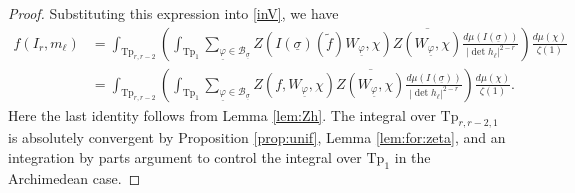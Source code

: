\documentclass[12pt]{amsart}
\theoremstyle{remark}
\numberwithin{equation}{section}
\theoremstyle{definition}
\numberwithin{equation}{subsection}
\begin{document}
\begin{proof}
Substituting this expression into \eqref{inV}, we have
 \begin{align*}
     f(I_r,m_\ell)&=\int_{\mathrm{Tp}_{r,r-2}}\left(\int_{\mathrm{Tp}_1} \sum_{\underline{\varphi}\in \mathcal{B}_{\underline{\sigma}}} Z(I(\underline{\sigma})(\widetilde{f})W_{\underline{\varphi}},\chi)\overline{Z(W_{\underline{\varphi}},\chi)}\frac{d\mu(I(\underline{\sigma}))}{|\det h_\ell|^{2-r}}\right)\frac{d\mu(\chi)}{\zeta(1)}\\
     &=\int_{\mathrm{Tp}_{r,r-2}}\left(\int_{\mathrm{Tp}_1} \sum_{\underline{\varphi}\in \mathcal{B}_{\underline{\sigma}}}
        Z(f,W_{\underline{\varphi}},\chi)\overline{Z(W_{\underline{\varphi}},\chi)}\frac{d\mu(I(\underline{\sigma}))}{|\det h_\ell|^{2-r}}\right)\frac{d\mu(\chi)}{\zeta(1)}.
 \end{align*}
Here the last identity follows from Lemma \ref{lem:Zh}. 
The integral over $\mathrm{Tp}_{r,r-2,1}$ is absolutely convergent by Proposition \ref{prop:unif}, Lemma \ref{lem:for:zeta}, and an integration by parts argument to control the integral over $\mathrm{Tp}_1$ in the Archimedean case.
  

\end{proof}
\end{document}
